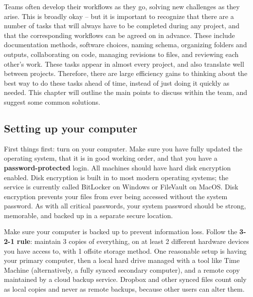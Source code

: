 Teams often develop their workflows as they go,
solving new challenges as they arise.
This is broadly okay -- but it is important to recognize
that there are a number of tasks that will always have to be completed during any project,
and that the corresponding workflows can be agreed on in advance.
These include documentation methods, software choices,
naming schema, organizing folders and outputs, collaborating on code,
managing revisions to files, and reviewing each other's work.
These tasks appear in almost every project,
and also translate well between projects.
Therefore, there are large efficiency gains to
thinking about the best way to do these tasks ahead of time,
instead of just doing it quickly as needed.
This chapter will outline the main points to discuss within the team,
and suggest some common solutions.

\subsection{Setting up your computer}

First things first: turn on your computer.
Make sure you have fully updated the operating system,
that it is in good working order,
and that you have a \textbf{password-protected} login.
All machines should have hard disk encryption enabled.
Disk encryption is built in to most modern operating systems;
the service is currently called BitLocker on Windows or FileVault on MacOS.
Disk encryption prevents your files from ever being accessed without the system password.
As with all critical passwords, your system password should be strong,
memorable, and backed up in a separate secure location.

Make sure your computer is backed up to prevent information loss.
Follow the \textbf{3-2-1 rule}: maintain 3 copies of everything,
on at least 2 different hardware devices you have access to,
with 1 offsite storage method.
One reasonable setup is having your primary computer,
then a local hard drive managed with a tool like Time Machine
(alternatively, a fully synced secondary computer),
and a remote copy maintained by a cloud backup service.
Dropbox and other synced files count only as local copies and never as remote backups,
because other users can alter them.

